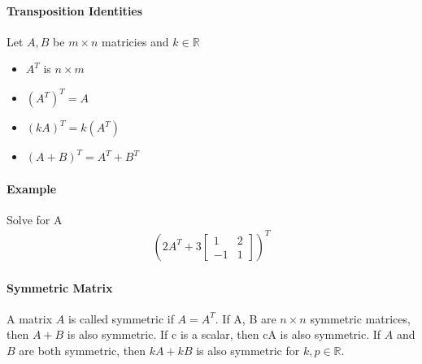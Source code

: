 \paragraph*{Transposition Identities}
Let $A, B$ be $m\times n$ matricies and $k \in \mathbb{R}$
\begin{itemize}
    \item $A^T$ is $n \times m$
    \item $(A^T)^T = A$
    \item $ (kA)^T = k(A^T)$
    \item $(A + B)^T = A^T + B^T$
\end{itemize}

\paragraph*{Example}
Solve for A
\begin{align*}
    (2A^T + 3 \begin{bmatrix}
        1 & 2 \\
        -1 & 1
    \end{bmatrix})^T
\end{align*}

\paragraph*{Symmetric Matrix} A matrix $A$ is called symmetric if $A = A^T$. If A, B are $n \times n$ symmetric matrices, then $A + B$ is also symmetric. If c is a scalar, then cA is also symmetric.
If $A$ and $B$ are both symmetric, then $kA + kB$ is also symmetric for $k, p \in \mathbb{R}$.